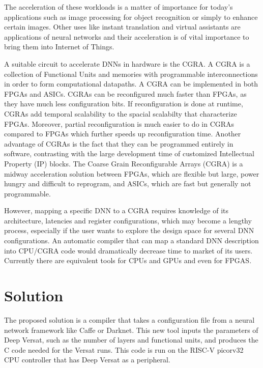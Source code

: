 The acceleration of these workloads is a matter of importance for today's
applications such as image processing for object recognition or simply to
enhance certain images. Other uses like instant translation and virtual
assistants are applications of neural networks and their acceleration is of
vital importance to bring them into Internet of Things.

A suitable circuit to accelerate DNNs in hardware is the CGRA. A CGRA is a
collection of Functional Units and memories with programmable interconnections
in order to form computational datapaths. A CGRA can be implemented in both
FPGAs and ASICs. CGRAs can be reconfigured much faster than FPGAs, as they have
much less configuration bits. If reconfiguration is done at runtime, CGRAs add
temporal scalability to the spacial scalabilty that characterize
FPGAs. Moreover, partial reconfiguration is much easier to do in CGRAs compared
to FPGAs which further speeds up reconfiguration time. Another advantage of
CGRAs is the fact that they can be programmed entirely in software, contrasting
with the large development time of customized Intellectual Property (IP) blocks.
The Coarse Grain Reconfigurable Arrays (CGRA) is a midway acceleration solution
between FPGAs, which are flexible but large, power hungry and difficult to
reprogram, and ASICs, which are fast but generally not programmable.

However, mapping a specific DNN to a CGRA requires knowledge of its
architecture, latencies and register configurations, which may become a lengthy
process, especially if the user wants to explore the design space for several
DNN configurations. An automatic compiler that can map a standard DNN
description into CPU/CGRA code would dramatically decrease time to market of its
users. Currently there are equivalent tools for CPUs and GPUs and
even for FPGAS.


\section{Solution}
\label{section:solution}

The proposed solution is a compiler that takes a configuration file from a
neural network framework like Caffe or Darknet. This new tool inputs the
parameters of Deep Versat, such as the number of layers and functional units,
and produces the C code needed for the Versat runs. This code is run on the
RISC-V picorv32~\cite{bla} CPU controller that has Deep Versat as a peripheral.


